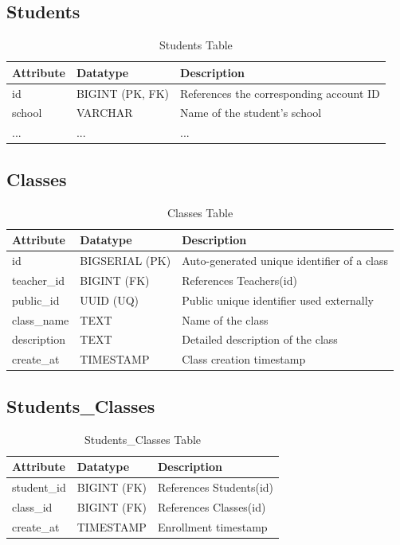 \documentclass[../report_main.tex]{subfiles}
\begin{document}
\subsection{Students}
\begin{table}[H]
\centering
\caption{Students Table}
\label{tab:students}
\renewcommand{\arraystretch}{1.25}
\begin{tabular}{|p{3cm}|p{3.5cm}|p{8.5cm}|}
\hline
\textbf{Attribute} & \textbf{Datatype} & \textbf{Description} \\ \hline
id & BIGINT (PK, FK) & References the corresponding account ID \\ \hline
school & VARCHAR & Name of the student's school \\ \hline
... & ... & ... \\ \hline
\end{tabular}
\end{table}

\subsection{Classes}
\begin{table}[H]
\centering
\caption{Classes Table}
\label{tab:classes}
\renewcommand{\arraystretch}{1.25}
\begin{tabular}{|p{3cm}|p{3.5cm}|p{8.5cm}|}
\hline
\textbf{Attribute} & \textbf{Datatype} & \textbf{Description} \\ \hline
id & BIGSERIAL (PK) & Auto-generated unique identifier of a class \\ \hline
teacher\_id & BIGINT (FK) & References Teachers(id) \\ \hline
public\_id & UUID (UQ) & Public unique identifier used externally \\ \hline
class\_name & TEXT & Name of the class \\ \hline
description & TEXT & Detailed description of the class \\ \hline
create\_at & TIMESTAMP & Class creation timestamp \\ \hline
\end{tabular}
\end{table}

\subsection{Students\_Classes}
\begin{table}[H]
\centering
\caption{Students\_Classes Table}
\label{tab:students_classes}
\renewcommand{\arraystretch}{1.25}
\begin{tabular}{|p{3cm}|p{3.5cm}|p{8.5cm}|}
\hline
\textbf{Attribute} & \textbf{Datatype} & \textbf{Description} \\ \hline
student\_id & BIGINT (FK) & References Students(id) \\ \hline
class\_id & BIGINT (FK) & References Classes(id) \\ \hline
create\_at & TIMESTAMP & Enrollment timestamp \\ \hline
\end{tabular}
\end{table}
\end{document}
